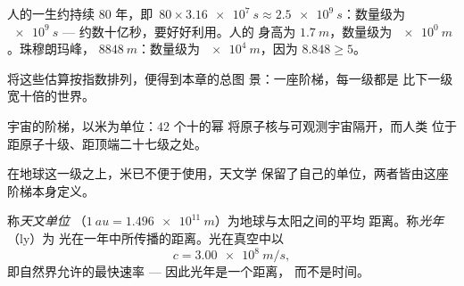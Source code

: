 \begin{example}[数量级举例]\label{ex:g10:orders-of-magnitude:oom}
人的一生约持续 $80$ 年，即\
$80 \times \qty{3.16e7}{s} \approx \qty{2.5e9}{s}$：数量级为
$\qty{e9}{s}$ --- 约数十亿秒，要好好利用。人的
身高为 $\qty{1.7}{m}$，数量级为 $\qty{e0}{m}$。珠穆朗玛峰，
$\qty{8848}{m}$：数量级为 $\qty{e4}{m}$，因为 $8.848 \geq 5$。
\end{example}

将这些估算按指数排列，便得到本章的总图
景：一座阶梯，每一级都是
比下一级宽十倍的世界。

\begin{omfigure}

{\small 宇宙的阶梯，以米为单位：$42$ 个十的幂
将原子核与可观测宇宙隔开，而人类
位于距原子十级、距顶端二十七级之处。}
\end{omfigure}

在地球这一级之上，米已不便于使用，天文学
保留了自己的单位，两者皆由这座阶梯本身定义。

\begin{definition}[天文单位与光年]\label{def:g10:orders-of-magnitude:lightyear}
称\emph{天文单位}\index{天文单位}
（$\qty{1}{au} = \qty{1.496e11}{m}$）为地球与太阳之间的平均
距离。称\emph{光年}（\unit{ly}）为
光在一年中所传播的距离。光在真空中以
\[
c = \qty{3.00e8}{m/s},
\]
即自然界允许的最快速率 --- 因此光年是一个距离，
而不是时间。
\end{definition}

